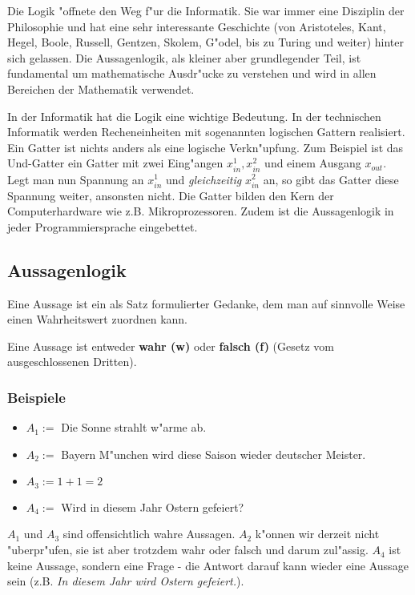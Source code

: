 Die Logik "offnete den Weg f"ur die Informatik. Sie war immer eine Disziplin der Philosophie und hat eine sehr interessante Geschichte (von Aristoteles, Kant, Hegel, Boole, Russell, Gentzen, Skolem, G"odel, bis zu Turing und weiter) hinter sich gelassen. Die Aussagenlogik, als kleiner aber grundlegender Teil, ist fundamental um mathematische Ausdr"ucke zu verstehen und wird in allen Bereichen der Mathematik verwendet.
\begin{warning}
In der Informatik hat die Logik eine wichtige Bedeutung. In der technischen Informatik werden Recheneinheiten mit sogenannten logischen Gattern realisiert. Ein Gatter ist nichts anders als eine logische Verkn"upfung. Zum Beispiel ist das Und-Gatter ein Gatter mit zwei Eing"angen $x_{in}^1, x_{in}^2$ und einem Ausgang $x_{out}$.\\
Legt man nun Spannung an $x_{in}^1$ und \textit{gleichzeitig} $x_{in}^2$ an, so gibt das Gatter diese Spannung weiter, ansonsten nicht. Die Gatter bilden den Kern der Computerhardware wie z.B. Mikroprozessoren. Zudem ist die Aussagenlogik in jeder Programmiersprache eingebettet.
\end{warning}

\subsection{Aussagenlogik}
\begin{definition}[Aussage]
Eine Aussage ist ein als Satz formulierter Gedanke, dem man auf sinnvolle Weise einen Wahrheitswert zuordnen kann.
\end{definition}
Eine Aussage ist entweder \textbf{wahr (w)} oder \textbf{falsch (f)} (Gesetz vom ausgeschlossenen Dritten).

\subsubsection*{Beispiele}
\begin{itemize}
\item $A_1 := $ Die Sonne strahlt w"arme ab.
\item $A_2 := $ Bayern M"unchen wird diese Saison wieder deutscher Meister.
\item $A_3 := 1+1 = 2$
\item $A_4 := $ Wird in diesem Jahr Ostern gefeiert?
\end{itemize}
$A_1$ und $A_3$ sind offensichtlich wahre Aussagen. $A_2$ k"onnen wir derzeit nicht "uberpr"ufen, sie ist aber trotzdem wahr oder falsch und darum zul"assig. $A_4$ ist keine Aussage, sondern eine Frage - die Antwort darauf kann wieder eine Aussage sein (z.B. \textit{In diesem Jahr wird Ostern gefeiert.}).

